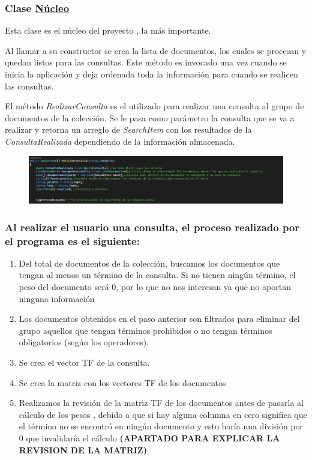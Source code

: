 \begin{frame}
        \frametitle{\huge{Clase \underline{\textbf{Núcleo}}}}
       
      \begin{block}{}
            Esta clase es el núcleo del proyecto , la más importante.

Al llamar a su constructor se crea la lista de documentos, los cuales se procesan y quedan listos para las consultas. Este método es invocado una vez cuando se inicia la aplicación y deja ordenada toda la información para cuando se realicen las consultas.

El método \emph{RealizarConsulta} es el utilizado para realizar una consulta al grupo de documentos de la colección. Se le pasa como parámetro la consulta que se va a realizar y retorna un arreglo de \emph{SearchItem} con los resultados de la \emph{ConsultaRealizada} dependiendo de la información almacenada. 
           \begin{figure}
                \includegraphics[width=120mm]{Imagen7.png}
            \end{figure}
        \end{block}

\end{frame}

 \begin{frame}
    
    \frametitle{\color{red}Al realizar el usuario una consulta, el proceso realizado por el programa es el siguiente:}
\begin{beamerboxesrounded}{}
        \begin{enumerate}
            \item Del total de documentos de la colección, buscamos los documentos que tengan al menos un término de la consulta. Si no tienen ningún término, el peso del documento será 0, por lo que no nos interesan ya que no aportan ninguna información 
            \item Los documentos obtenidos en el paso anterior son filtrados para eliminar del grupo aquellos que tengan términos prohibidos o no tengan términos obligatorios (según los operadores). 
            \item  Se crea el vector TF de la consulta.             
            \item Se crea la matriz con los vectores TF de los documentos 
            \item Realizamos la revisión de la matriz TF de los documentos antes de pasarla al cálculo de los pesos , debido a que si hay alguna columna en cero significa que el término no se encontró en ningún documento y esto haría una división por 0 que invalidaría el cálculo \textbf{(APARTADO PARA EXPLICAR LA REVISION DE LA MATRIZ)}       
        \end{enumerate}
        \end{beamerboxesrounded}
\end{frame}


